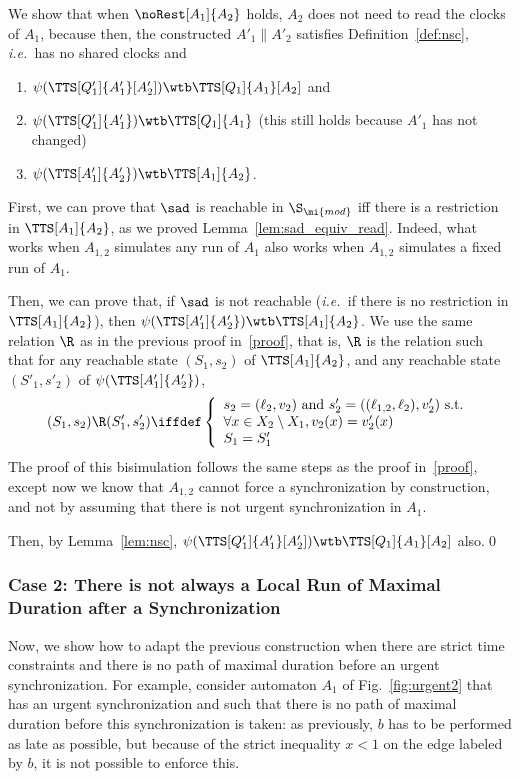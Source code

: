 \documentclass{LMCS}
\theoremstyle{plain}\newtheorem*{prop11}{Proposition~\ref{prop:states} bis}
\def\ie{{\em i.e.\ }}
\begin{document}
\noindent We show that when $\noRest[A_1]{A_2}$ holds, $A_2$ does not need to read the clocks of
$A_1$, because then, the constructed $A'_1\parallel A'_2$ satisfies Definition~\ref{def:nsc},
\ie has no shared clocks and
  \begin{enumerate}
    \item $\psi(\TTS[Q_1']{A'_1}[A'_2])\wtb\TTS[Q_1]{A_1}[A_2]$ and
    \item $\psi(\TTS[Q'_1]{A'_1})\wtb\TTS[Q_1]{A_1}$ (this still holds because
    $A'_1$ has not changed)
    \item $\psi(\TTS[A'_1]{A'_2})\wtb\TTS[A_1]{A_2}$.
  \end{enumerate}

  First, we can prove that
  $\sad$ is reachable in $\S_\mi{mod}$ iff there is a restriction
  in $\TTS[A_1]{A_2}$, as we proved Lemma~\ref{lem:sad_equiv_read}.
  Indeed, what works when $A_{1,2}$ simulates any run of $A_1$ also
  works when $A_{1,2}$ simulates a fixed run of $A_1$.

  Then, we can prove that, if $\sad$ is not reachable (\ie if there is
  no restriction in $\TTS[A_1]{A_2}$),
  then $\psi(\TTS[A'_1]{A'_2})\wtb\TTS[A_1]{A_2}$.
  We use the same relation $\R$ as in the previous proof in~\ref{proof},
  that is, $\R$ is the relation such that for any reachable state $(S_1,s_2)$ of
  $\TTS[A_1]{A_2}$, and any reachable state $(S'_1,s'_2)$ of $\psi(\TTS[A'_1]{A'_2})$,
  \[(S_1,s_2)\R(S'_1,s'_2) \iffdef\left\{
  \begin{array}{l}
    s_2=(\ell_2, v_2)\text{ and }s'_2=((\ell_{1,2},\ell_2),v'_2)\text{ s.t.}\\
    \forall x\in X_2\setminus X_1, v_2(x)=v'_2(x)\\
    S_1=S'_1\\
  \end{array}
  \right.\]
  The proof of this bisimulation follows the same steps as the proof in~\ref{proof},
  except now we know that $A_{1,2}$ cannot force a synchronization by construction,
  and not by assuming that there is not urgent synchronization in $A_1$.

  Then, by Lemma~\ref{lem:nsc}, $\psi(\TTS[Q'_1]{A'_1}[A'_2])\wtb\TTS[Q_1]{A_1}[A_2]$
  also.\qed


\subsubsection*{Case 2: There is not always a Local Run of Maximal Duration after a Synchronization}
Now, we show how to adapt the previous construction when there are strict time
constraints and there is no path of maximal duration before an urgent
synchronization. For example, consider automaton $A_1$ of Fig.~\ref{fig:urgent2}
that has an urgent synchronization and such that there is no path of maximal duration
before this synchronization is taken: as previously, $b$ has to be performed
as late as possible, but because of the strict inequality $x<1$ on the edge
labeled by $b$, it is not possible to enforce this.
\end{document}
